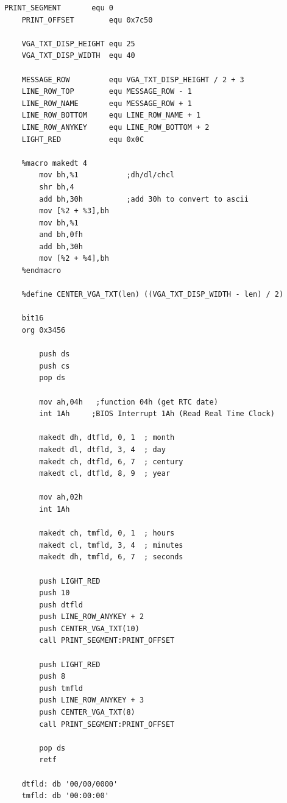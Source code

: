 \documentclass{article}
\begin{document}
    \begin{lstlisting}[caption={datetimeV03.asm listing}, captionpos=t]
        PRINT_SEGMENT       equ 0
    PRINT_OFFSET        equ 0x7c50

    VGA_TXT_DISP_HEIGHT equ 25
    VGA_TXT_DISP_WIDTH  equ 40

    MESSAGE_ROW         equ VGA_TXT_DISP_HEIGHT / 2 + 3
    LINE_ROW_TOP        equ MESSAGE_ROW - 1
    LINE_ROW_NAME       equ MESSAGE_ROW + 1
    LINE_ROW_BOTTOM     equ LINE_ROW_NAME + 1
    LINE_ROW_ANYKEY     equ LINE_ROW_BOTTOM + 2
    LIGHT_RED           equ 0x0C

    %macro makedt 4
        mov bh,%1 			;dh/dl/chcl
        shr bh,4
        add bh,30h 			;add 30h to convert to ascii
        mov [%2 + %3],bh
        mov bh,%1
        and bh,0fh
        add bh,30h
        mov [%2 + %4],bh
    %endmacro

    %define CENTER_VGA_TXT(len) ((VGA_TXT_DISP_WIDTH - len) / 2)

    bit16
    org 0x3456

        push ds
        push cs
        pop ds

        mov ah,04h	 ;function 04h (get RTC date)
        int 1Ah		;BIOS Interrupt 1Ah (Read Real Time Clock)

        makedt dh, dtfld, 0, 1  ; month
        makedt dl, dtfld, 3, 4  ; day
        makedt ch, dtfld, 6, 7  ; century
        makedt cl, dtfld, 8, 9  ; year

        mov ah,02h
        int 1Ah

        makedt ch, tmfld, 0, 1  ; hours
        makedt cl, tmfld, 3, 4  ; minutes
        makedt dh, tmfld, 6, 7  ; seconds

        push LIGHT_RED
        push 10
        push dtfld
        push LINE_ROW_ANYKEY + 2
        push CENTER_VGA_TXT(10)
        call PRINT_SEGMENT:PRINT_OFFSET

        push LIGHT_RED
        push 8
        push tmfld
        push LINE_ROW_ANYKEY + 3
        push CENTER_VGA_TXT(8)
        call PRINT_SEGMENT:PRINT_OFFSET

        pop ds
        retf

    dtfld: db '00/00/0000'
    tmfld: db '00:00:00'
    \end{lstlisting}
\end{document}
